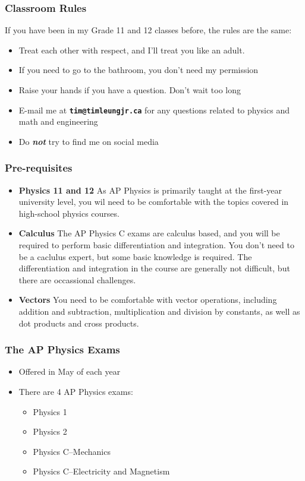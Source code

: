 \documentclass[12pt,compress,aspectratio=169]{beamer}
\begin{document}
\begin{frame}
  \frametitle{Classroom Rules}
  If you have been in my Grade 11 and 12 classes before, the rules are the
  same:
  \begin{itemize}
  \item Treat each other with respect, and I'll treat you like an adult.
  \item If you need to go to the bathroom, you don't need my permission
  \item Raise your hands if you have a question. Don't wait too long
  \item E-mail me at \textbf{\texttt{tim@timleungjr.ca}} for any questions
    related to physics and math and engineering
  \item Do \textbf{\emph{not}} try to find me on social media
  \end{itemize}
\end{frame}


\begin{frame}
  \titlepage
\end{frame}



\begin{frame}
  \frametitle{Pre-requisites}
  \begin{itemize}
  \item\textbf{Physics 11 and 12} As AP Physics is primarily taught at the
    first-year university level, you wil need to be comfortable with the topics
    covered in high-school physics courses.
  \item\textbf{Calculus} The AP Physics C exams are calculus based, and you
    will be required to perform basic differentiation and integration. You
    don't need to be a caclulus expert, but some basic knowledge is required.
    The differentiation and integration in the course are generally not
    difficult, but there are occassional challenges.
  \item\textbf{Vectors} You need to be comfortable with vector operations,
    including addition and subtraction, multiplication and division by
    constants, as well as dot products and cross products.
  \end{itemize}
\end{frame}



\begin{frame}
  \frametitle{The AP Physics Exams}
  \begin{itemize}
  \item Offered in May of each year
  \item There are 4 AP Physics exams:
    \begin{itemize}
    \item Physics 1
    \item Physics 2
    \item Physics C--Mechanics
    \item Physics C--Electricity and Magnetism
    \end{itemize}
  \end{itemize}
\end{frame}
\end{document}
